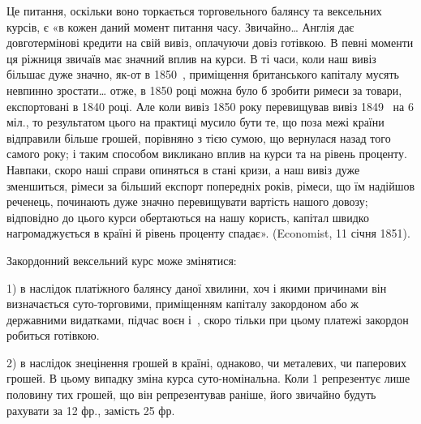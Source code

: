 Це питання, оскільки воно торкається торговельного балянсу та вексельних
курсів, є «в кожен даний момент питання часу. Звичайно\dots{} Англія дає
довготермінові кредити на свій вивіз, оплачуючи довіз готівкою. В певні моменти
ця ріжниця звичаїв має значний вплив на курси. В ті часи, коли наш
вивіз більшає дуже значно, як-от в 1850~, приміщення британського капіталу
мусять невпинно зростати\dots{} отже, в 1850 році можна було б зробити римеси
за товари, експортовані в 1840 році. Але коли вивіз 1850 року перевищував
вивіз 1849~ на 6 міл., то результатом цього на практиці мусило бути те, що
поза межі країни відправили більше грошей, порівняно з тією сумою, що вернулася
назад того самого року; і таким способом викликано вплив на курси
та на рівень проценту. Навпаки, скоро наші справи опиняться в стані кризи,
а наш вивіз дуже зменшиться, рімеси за більший експорт попередніх років, рімеси,
що їм надійшов реченець, починають дуже значно перевищувати вартість нашого
довозу; відповідно до цього курси обертаються на нашу користь, капітал швидко
нагромаджується в країні й рівень проценту спадає». (Economist, 11 січня 1851).

Закордонний вексельний курс може змінятися:

1) в наслідок платіжного балянсу даної хвилини, хоч і якими причинами він
визначається суто-торговими, приміщенням капіталу закордоном або ж державними
видатками, підчас воєн і~, скоро тільки при цьому платежі закордон
робиться готівкою.

2) в наслідок знецінення грошей в країні, однаково, чи металевих, чи
паперових грошей. В цьому випадку зміна курса суто-номінальна. Коли 1
репрезентує лише половину тих грошей, що він репрезентував раніше, його
звичайно будуть рахувати за 12 фр., замість 25 фр.
